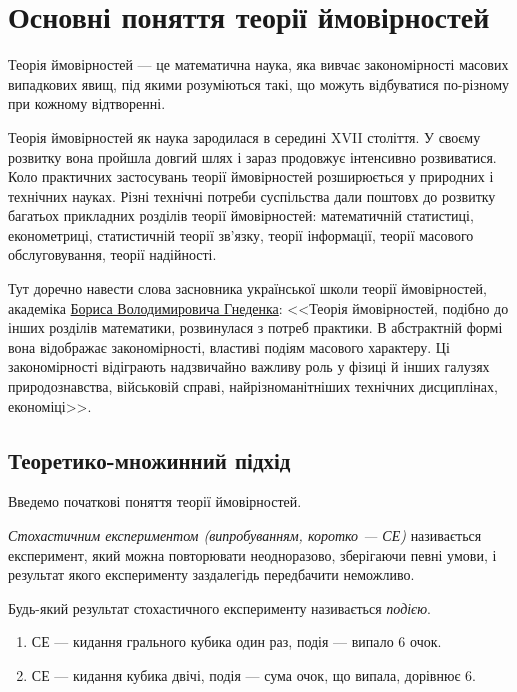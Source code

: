 
\section{Основні поняття теорії ймовірностей}
Теорія ймовірностей --- це математична наука, яка вивчає закономірності масових випадкових явищ, під якими розуміються такі,
що можуть відбуватися по-різному при кожному відтворенні.

Теорія ймовірностей як наука зародилася в середині XVII століття. У своєму розвитку вона пройшла довгий шлях
і зараз продовжує інтенсивно розвиватися. Коло практичних застосувань теорії ймовірностей розширюється у природних і технічних науках.
Різні технічні потреби суспільства дали поштовх до розвитку багатьох прикладних розділів теорії ймовірностей: математичній статистиці,
економетриці, статистичній теорії зв'язку,
теорії інформації, теорії масового обслуговування, теорії надійності.

Тут доречно навести слова засновника української школи теорії ймовірностей,
академіка 
\href{https://uk.wikipedia.org/wiki/%D0%93%D0%BD%D1%94%D0%B4%D0%B5%D0%BD%D0%BA%D0%BE_%D0%91%D0%BE%D1%80%D0%B8%D1%81_%D0%92%D0%BE%D0%BB%D0%BE%D0%B4%D0%B8%D0%BC%D0%B8%D1%80%D0%BE%D0%B2%D0%B8%D1%87}{Бориса Володимировича Гнеденка}: 
<<Теорія ймовірностей, подібно до інших розділів математики, розвинулася з потреб практики.
В абстрактній формі вона відображає закономірності, властиві подіям масового характеру. Ці закономірності відіграють надзвичайно важливу
роль у фізиці й інших галузях природознавства, військовій справі, найрізноманітніших технічних дисциплінах, економіці>>.

\subsection{Теоретико-множинний підхід}
Введемо початкові поняття теорії ймовірностей.
\begin{definition}
    \emph{Стохастичним експериментом (випробуванням, коротко --- СЕ)} називається експеримент, 
    який можна повторювати неодноразово, зберігаючи певні умови, і результат якого 
    експерименту заздалегідь передбачити неможливо.
\end{definition}
\begin{definition}
    Будь-який результат стохастичного експерименту називається \emph{подією}.
\end{definition}
\begin{example}
    \begin{enumerate}
        \item СЕ --- кидання грального кубика один раз, подія --- випало 6 очок.
        \item СЕ --- кидання кубика двічі, подія --- сума очок, що випала, дорівнює 6.
    \end{enumerate}
\end{example}

